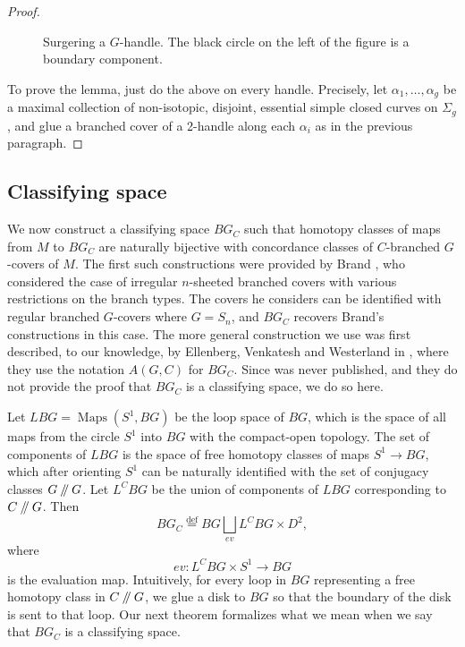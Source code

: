\documentclass[10pt,twocolumn,amsmath,amssymb,aps,pra,secnumarabic,
    nofootinbib,groupedaddress]{revtex4-1}
\newcommand{\defeq}{\stackrel{\mathrm{def}}=}
\newcommand{\sslash}{\mathbin{/\mkern-5mu/}}
\newcommand{\Maps}{\operatorname{Maps}}
\begin{document}
\begin{proof}
\begin{figure*}
\caption{Surgering a $G$-handle.  The black circle on the left of the figure is a boundary component.}
\label{f:unbranched}
\end{figure*}

To prove the lemma, just do the above on every handle.  Precisely, let $\alpha_1,\dots,\alpha_g$ be a maximal collection of non-isotopic, disjoint, essential simple closed curves on $\Sigma_g$, and glue a branched cover of a 2-handle along each $\alpha_i$ as in the previous paragraph.
\end{proof}

\subsection{Classifying space}
\label{ss:classifying}
We now construct a classifying space $BG_C$ such that homotopy classes of maps from $M$ to $BG_C$ are naturally bijective with concordance classes of $C$-branched $G$-covers of $M$.  The first such constructions were provided by Brand \cite{Brand:branched}, who considered the case of irregular $n$-sheeted branched covers with various restrictions on the branch types.  The covers he considers can be identified with regular branched $G$-covers where $G=S_n$, and $BG_C$ recovers Brand's constructions in this case.  The more general construction we use was first described, to our knowledge, by Ellenberg, Venkatesh and Westerland in \cite{EVW:hurwitz2}, where they use the notation $A(G,C)$ for $BG_C$.  Since \cite{EVW:hurwitz2} was never published, and they do not provide the proof that $BG_C$ is a classifying space, we do so here.

Let $LBG = \Maps(S^1,BG)$ be the loop space of $BG$, which is the space of all maps from the circle $S^1$ into $BG$ with the compact-open topology.  The set of components of $LBG$ is the space of free homotopy classes of maps $S^1 \to BG$, which after orienting $S^1$ can be naturally identified with the set of conjugacy classes $G\sslash G$.  Let $L^CBG$ be the union of components of $LBG$ corresponding to $C\sslash G$.  Then
\[ BG_C \defeq BG \bigsqcup_{ev} L^CBG \times D^2, \]
where
\[ ev: L^CBG \times S^1 \to BG \]
is the evaluation map.  Intuitively, for every loop in $BG$ representing a free homotopy class in $C\sslash G$, we glue a disk to $BG$ so that the boundary of the disk is sent to that loop.  Our next theorem formalizes what we mean when we say that $BG_C$ is a classifying space.
\end{document}
